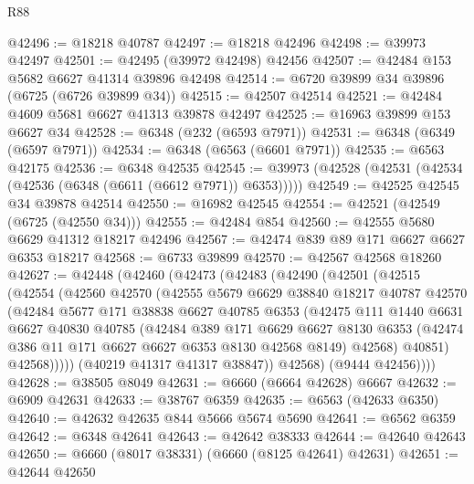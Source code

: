 \begin{lexlean}{R88}
\begin{coremodule}
@42496 := @18218 @40787
@42497 := @18218 @42496
@42498 := @39973 @42497
@42501 := @42495 (@39972 @42498) @42456
@42507 := @42484 @153 @5682 @6627 @41314 @39896 @42498
@42514 := @6720 @39899 @34 @39896 (@6725 (@6726 @39899 @34))
@42515 := @42507 @42514
@42521 := @42484 @4609 @5681 @6627 @41313 @39878 @42497
@42525 := @16963 @39899 @153 @6627 @34
@42528 := @6348 (@232 (@6593 @7971))
@42531 := @6348 (@6349 (@6597 @7971))
@42534 := @6348 (@6563 (@6601 @7971))
@42535 := @6563 @42175
@42536 := @6348 @42535
@42545 := @39973 (@42528 (@42531 (@42534 (@42536 (@6348 (@6611 (@6612 @7971)) @6353)))))
@42549 := @42525 @42545 @34 @39878 @42514
@42550 := @16982 @42545
@42554 := @42521 (@42549 (@6725 (@42550 @34)))
@42555 := @42484 @854
@42560 := @42555 @5680 @6629 @41312 @18217 @42496
@42567 := @42474 @839 @89 @171 @6627 @6627 @6353 @18217
@42568 := @6733 @39899
@42570 := @42567 @42568 @18260
@42627 := @42448
    (@42460
      (@42473
        (@42483
          (@42490
            (@42501
              (@42515
                (@42554
                  (@42560
                    @42570
                    (@42555
                      @5679
                      @6629
                      @38840
                      @18217
                      @40787
                      @42570
                      (@42484
                        @5677
                        @171
                        @38838
                        @6627
                        @40785
                        @6353
                        (@42475
                          @111
                          @1440
                          @6631
                          @6627
                          @40830
                          @40785
                          (@42484
                            @389
                            @171
                            @6629
                            @6627
                            @8130
                            @6353
                            (@42474 @386 @11 @171 @6627 @6627 @6353 @8130 @42568 @8149)
                            @42568)
                          @40851)
                        @42568)))))
              (@40219 @41317 @41317 @38847))
            @42568)
          (@9444 @42456))))
@42628 := @38505 @8049
@42631 := @6660 (@6664 @42628) @6667
@42632 := @6909 @42631
@42633 := @38767 @6359
@42635 := @6563 (@42633 @6350)
@42640 := @42632 @42635 @844 @5666 @5674 @5690
@42641 := @6562 @6359
@42642 := @6348 @42641
@42643 := @42642 @38333
@42644 := @42640 @42643
@42650 := @6660 (@8017 @38331) (@6660 (@8125 @42641) @42631)
@42651 := @42644 @42650

\end{coremodule}
\end{lexlean}
